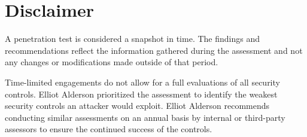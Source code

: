 \documentclass[a4paper]{article} %
\newcommand{\clientName}{Hack The Box 2}
\newcommand{\theAuthor}{Elliot Alderson}
\begin{document}
    \clearpage

    \section{Disclaimer} %
    A penetration test is considered a snapshot in time. The findings and recommendations reflect the information gathered during the assessment and not any changes or modifications made outside of that period.

    Time-limited engagements do not allow for a full evaluations of all security controls. {\theAuthor} prioritized the assessment to identify the weakest security controls an attacker would exploit. {\theAuthor} recommends conducting similar assessments on an annual basis by internal or third-party assessors to ensure the continued success of the controls.
    
    \clearpage
    
\end{document}
